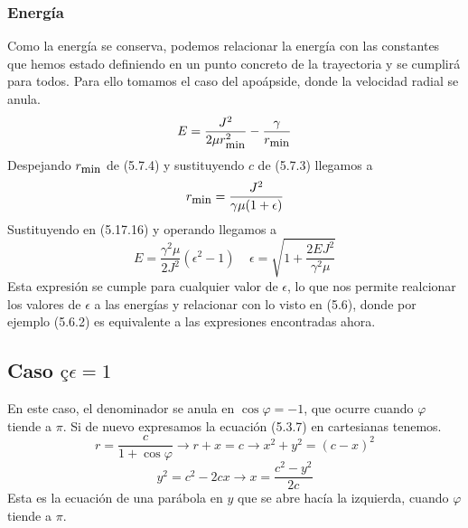 \subsubsection{Energía}
Como la energía se conserva, podemos relacionar la energía con las constantes que hemos estado definiendo en un punto concreto de la trayectoria y se cumplirá para todos.
Para ello tomamos el caso del apoápside, donde la velocidad radial se anula.
\begin{equation} \label{5.1.14}
    E = \frac{J^2}{2\mu r_{\mbox{\small min}}^2}-\frac{\gamma }{r_{\mbox{\small min}}}
\end{equation} 
Despejando $r_{\mbox{\small min}}$ de (5.7.4) y sustituyendo $c$ de (5.7.3) llegamos a 
\begin{equation} \label{5.1.14}
    r_{\mbox{\small min}} = \frac{J^2}{\gamma \mu (1+\epsilon)}
\end{equation} 
Sustituyendo en (5.17.16) y operando llegamos a 
\begin{equation} \label{5.1.14}
    E = \frac{\gamma^2 \mu}{2 J^2} (\epsilon^2-1) \ \ \ \ \ \epsilon = \sqrt{1+\frac{2EJ^2}{\gamma^2 \mu}}
\end{equation} 
Esta expresión se cumple para cualquier valor de $\epsilon$, lo que nos permite realcionar los valores de $\epsilon$ a las energías y relacionar con lo visto en (5.6), donde por ejemplo (5.6.2) es equivalente a las expresiones encontradas ahora.
\subsection{Caso $ç\epsilon = 1 $}
En este caso, el denominador se anula en $\cos \varphi = -1$, que ocurre cuando $\varphi$ tiende a $\pi$. Si de nuevo expresamos la ecuación (5.3.7) en cartesianas tenemos.
\begin{equation} \label{5.1.14}
    r = \frac{c}{1+\cos\varphi} \rightarrow r+x=c \rightarrow x^2+y^2 = (c-x)^2
\end{equation} 
\vspace{-15pt}
\begin{equation} \label{5.1.14}
    y^2 = c^2 -2cx \rightarrow x = \frac{c^2 - y^2}{2c}
\end{equation} 
Esta es la ecuación de una parábola en $y$ que se abre hacía la izquierda, cuando $\varphi$ tiende a $\pi$.
